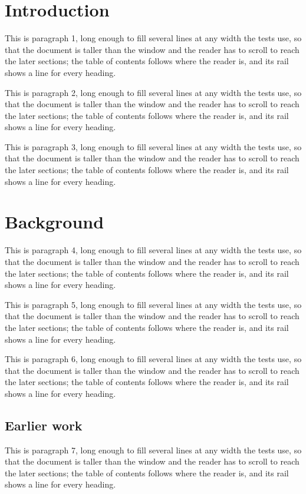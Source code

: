
\section{Introduction}
This is paragraph 1, long enough to fill several lines at any width the tests use, so that the
document is taller than the window and the reader has to scroll to reach the later sections; the
table of contents follows where the reader is, and its rail shows a line for every heading.

This is paragraph 2, long enough to fill several lines at any width the tests use, so that the
document is taller than the window and the reader has to scroll to reach the later sections; the
table of contents follows where the reader is, and its rail shows a line for every heading.

This is paragraph 3, long enough to fill several lines at any width the tests use, so that the
document is taller than the window and the reader has to scroll to reach the later sections; the
table of contents follows where the reader is, and its rail shows a line for every heading.

\section{Background}
This is paragraph 4, long enough to fill several lines at any width the tests use, so that the
document is taller than the window and the reader has to scroll to reach the later sections; the
table of contents follows where the reader is, and its rail shows a line for every heading.

This is paragraph 5, long enough to fill several lines at any width the tests use, so that the
document is taller than the window and the reader has to scroll to reach the later sections; the
table of contents follows where the reader is, and its rail shows a line for every heading.

This is paragraph 6, long enough to fill several lines at any width the tests use, so that the
document is taller than the window and the reader has to scroll to reach the later sections; the
table of contents follows where the reader is, and its rail shows a line for every heading.

\subsection{Earlier work}
This is paragraph 7, long enough to fill several lines at any width the tests use, so that the
document is taller than the window and the reader has to scroll to reach the later sections; the
table of contents follows where the reader is, and its rail shows a line for every heading.

